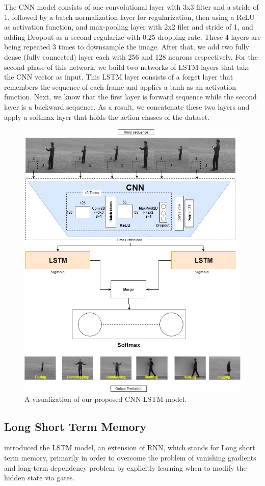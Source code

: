 The CNN model consists of one convolutional layer with 3x3 filter and a stride of 1, followed by a batch normalization layer for regularization, then using a ReLU as activation function, and max-pooling layer with 2x2 filer and stride of 1, and adding Dropout as a second regularize with 0.25 dropping rate. These 4 layers are being repeated 3 times to downsample the image. After that, we add two fully dense (fully connected) layer each with 256 and 128 neurons respectively. For the second phase of this network, we build two networks of LSTM layers that take the CNN vector as input. This LSTM layer consists of a forget layer that remembers the sequence of each frame and applies a tanh as an activation function. Next, we know that the first layer is forward sequence while the second layer is a backward sequence. As a result, we concatenate these two layers and apply a softmax layer that holds the action classes of the dataset. 
\begin{figure}[ht]
\centering
\includegraphics[width=0.75\columnwidth]{Figures/cnnlstm.png}
\decoRule
\caption[A visualization of our proposed CNN-LSTM model.]{A visualization of our proposed CNN-LSTM model.}
\label{fig:lstmcnn}
\end{figure}


\subsection{Long Short Term Memory}
\cite{hochreiter1997long} introduced the LSTM model, an extension of RNN, which stands for Long short term memory, primarily in order to overcome the problem of vanishing gradients and long-term dependency problem by explicitly learning when to modify the hidden state via gates.\\

